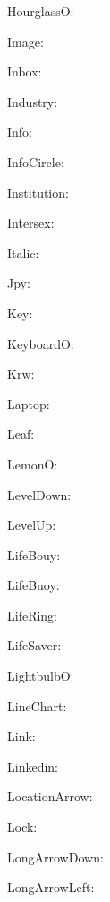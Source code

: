 \documentclass{article}
\begin{document}
      HourglassO: \faHourglassO\ 

      Image: \faImage\ 

      Inbox: \faInbox\ 

      Industry: \faIndustry\ 

      Info: \faInfo\ 

      InfoCircle: \faInfoCircle\ 

      Institution: \faInstitution\ 

      Intersex: \faIntersex\ 

      Italic: \faItalic\ 

      Jpy: \faJpy\ 

      Key: \faKey\ 

      KeyboardO: \faKeyboardO\ 

      Krw: \faKrw\ 

      Laptop: \faLaptop\ 

      Leaf: \faLeaf\ 

      LemonO: \faLemonO\ 

      LevelDown: \faLevelDown\ 

      LevelUp: \faLevelUp\ 

      LifeBouy: \faLifeBouy\ 

      LifeBuoy: \faLifeBuoy\ 

      LifeRing: \faLifeRing\ 

      LifeSaver: \faLifeSaver\ 

      LightbulbO: \faLightbulbO\ 

      LineChart: \faLineChart\ 

      Link: \faLink\ 

      Linkedin: \faLinkedin\ 

      LocationArrow: \faLocationArrow\ 

      Lock: \faLock\ 

      LongArrowDown: \faLongArrowDown\ 

      LongArrowLeft: \faLongArrowLeft\ 
\end{document}
